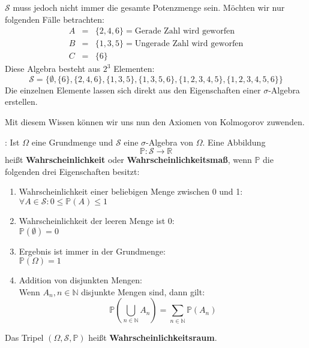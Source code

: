 {\begin{bsp}
        $\mathcal S$ muss jedoch nicht immer die gesamte Potenzmenge sein. Möchten wir nur folgenden Fälle betrachten:
        \begin{eqnarray*}
            A &=& \{2,4,6\}=\text{Gerade Zahl wird geworfen}\\
            B &=& \{1,3,5\}=\text{Ungerade Zahl wird geworfen}\\
        C &=& \{6\}
        \end{eqnarray*}
        Diese Algebra besteht aus $2^3$ Elementen:
        \begin{equation*}
            \mathcal S=\{\emptyset,\{6\},\{2,4,6\},\{1,3,5\},\{1,3,5,6\},\{1,2,3,4,5\},\{1,2,3,4,5,6\}\}
        \end{equation*}
        Die einzelnen Elemente lassen sich direkt aus den Eigenschaften einer $\sigma$-Algebra erstellen.
    \end{bsp}
    
    Mit diesem Wissen können wir uns nun den Axiomen von Kolmogorov zuwenden.

    \begin{definition}\label{def:axiome_kolmogorov}:
        Ist  $\Omega$ eine Grundmenge und $\mathcal S$ eine $\sigma$-Algebra von $\Omega$. Eine Abbildung
        \begin{equation*}
            \mathbb{P}:\mathcal S\rightarrow \mathbb{R}
        \end{equation*}
        heißt \textbf{Wahrscheinlichkeit} oder \textbf{Wahrscheinlichkeitsmaß}, wenn $\mathbb{P}$ die folgenden drei Eigenschaften besitzt:

        \begin{enumerate}
            \item Wahrscheinlichkeit einer beliebigen Menge zwischen 0 und 1:\\
                $\forall A\in \mathcal S: 0\leq\mathbb{P}(A)\leq 1$
            \item Wahrscheinlichkeit der leeren Menge ist 0:\\
                $\mathbb P\left({\emptyset}\right)=0$
            \item Ergebnis ist immer in der Grundmenge:\\ 
                $\mathbb P\left(\Omega \right)=1$
            \item Addition von disjunkten Mengen:\\
                Wenn $A_{n},n\in\mathbb{N}$ disjunkte Mengen sind, dann gilt:
                \[\mathbb{P}\left(\bigcup_{n\in\mathbb{N}}A_n\right)=\sum_{n\in\mathbb{N}}\mathbb{P}(A_n)\]
        \end{enumerate}
        Das Tripel $(\Omega, \mathcal S, \mathbb{P})$ heißt \textbf{Wahrscheinlichkeitsraum}.
    \end{definition}

}
